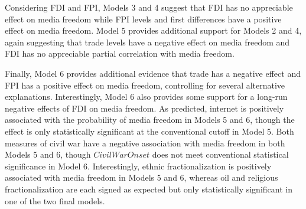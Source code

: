 \documentclass[12pt,a4paper]{article}\usepackage[]{graphicx}\usepackage[]{color}
\begin{document}
Considering FDI and FPI, Models 3 and 4 suggest that FDI has no appreciable effect on media freedom while FPI levels and first differences have a positive effect on media freedom. Model 5 provides additional support for Models 2 and 4, again suggesting that trade levels have a negative effect on media freedom and FDI has no appreciable partial correlation with media freedom.

Finally, Model 6 provides additional evidence that trade has a negative effect and FPI has a positive effect on media freedom, controlling for several alternative explanations. Interestingly, Model 6 also provides some support for a long-run negative effects of FDI on media freedom. As predicted, internet is positively associated with the probability of media freedom in Models 5 and 6, though the effect is only statistically significant at the conventional cutoff in Model 5. Both measures of civil war have a negative association with media freedom in both Models 5 and 6, though $Civil War Onset$ does not meet conventional statistical significance in Model 6. Interestingly, ethnic fractionalization is positively associated with media freedom in Models 5 and 6, whereas oil and religious fractionalization are each signed as expected but only statistically significant in one of the two final models.
\end{document}
